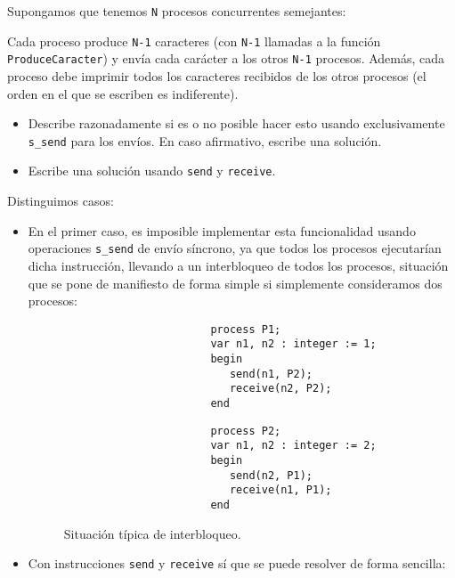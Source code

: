 \begin{ejercicio}\label{ej:rel3_11}
    Supongamos que tenemos \verb|N| procesos concurrentes semejantes:

    Cada proceso produce \verb|N-1| caracteres (con \verb|N-1| llamadas a la función \verb|ProduceCaracter|) y envía cada carácter a los otros \verb|N-1| procesos. Además, cada proceso debe imprimir todos los caracteres recibidos de los otros procesos (el orden en el que se escriben es indiferente).
    \begin{itemize}
        \item Describe razonadamente si es o no posible hacer esto usando exclusivamente \verb|s_send| para los envíos. En caso afirmativo, escribe una solución.
        \item Escribe una solución usando \verb|send| y \verb|receive|.
    \end{itemize}
    Distinguimos casos:
    \begin{itemize}
        \item En el primer caso, es imposible implementar esta funcionalidad usando operaciones \verb|s_send| de envío síncrono, ya que todos los procesos ejecutarían dicha instrucción, llevando a un interbloqueo de todos los procesos, situación que se pone de manifiesto de forma simple si simplemente consideramos dos procesos:
            \begin{figure}[H]
                \setlength{\columnsep}{1cm}
                \begin{multicols}{2}
                    \begin{verbatim}
                       process P1;    
                       var n1, n2 : integer := 1;
                       begin
                          send(n1, P2);
                          receive(n2, P2);
                       end
                    \end{verbatim}
                    \begin{verbatim}
                       process P2;    
                       var n1, n2 : integer := 2;
                       begin
                          send(n2, P1);
                          receive(n1, P1);
                       end
                    \end{verbatim}
                \end{multicols}
                \caption{Situación típica de interbloqueo.}
            \end{figure}
        \item Con instrucciones \verb|send| y \verb|receive| sí que se puede resolver de forma sencilla:

\end{itemize}
\end{ejercicio}
